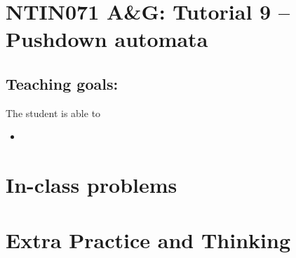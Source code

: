 \documentclass[a4paper,12pt]{amsart}
\begin{document}
\thispagestyle{empty}

\section*{NTIN071 A\&G: Tutorial 9 -- Pushdown automata}

\medskip

\subsection*{Teaching goals:} The student is able to

    \begin{itemize}\setlength{\itemsep}{0pt}
        \item 
    \end{itemize}


\section*{In-class problems}


\medskip\begin{problem}

\end{problem}


\section*{Extra Practice and Thinking}


\medskip\begin{problem}

\end{problem}
\end{document}
